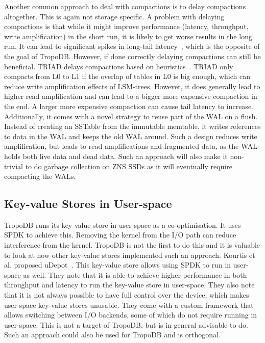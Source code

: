 Another common approach to deal with compactions is to delay compactions altogether. This is again not storage specific. A problem with delaying compactions is that while it might improve performance (latency, throughput, write amplification) in the short run, it is likely to get worse results in the long run. It can lead to significant spikes in long-tail latency~\cite{balmau2019silk, chai2019ldc}, which is the opposite of the goal of TropoDB. However, if done correctly delaying compactions can still be beneficial. TRIAD delays compactions based on heuristics~\cite{balmau2017triad}. TRIAD only compacts from L0 to L1 if the overlap of tables in L0 is big enough, which can reduce write amplification effects of LSM-trees. However, it does generally lead to higher read amplification and can lead to a bigger more expensive compaction in the end. A larger more expensive compaction can cause tail latency to increase. Additionally, it comes with a novel strategy to reuse part of the WAL on a flush. Instead of creating an SSTable from the immutable memtable, it writes references to data in the WAL and keeps the old WAL around. Such a design reduces write amplification, but leads to read amplifications and fragmented data, as the WAL holds both live data and dead data. Such an approach will also make it non-trivial to do garbage collection on ZNS SSDs as it will eventually require compacting the WALs.

\subsection{Key-value Stores in User-space}
TropoDB runs its key-value store in user-space as a co-optimisation. It uses SPDK to achieve this. Removing the kernel from the I/O path can reduce interference from the kernel. TropoDB is not the first to do this and it is valuable to look at how other key-value stores implemented such an approach. Kourtis et al. proposed uDepot~\cite{kourtis2019reaping}. This key-value store allows using SPDK to run in user-space as well. They note that it is able to achieve higher performance in both throughput and latency to run the key-value store in user-space. They also note that it is not always possible to have full control over the device, which makes user-space key-value stores unusable. They come with a custom framework that allows switching between I/O backends, some of which do not require running in user-space. This is not a target of TropoDB, but is in general advisable to do. Such an approach could also be used for TropoDB and is orthogonal.

